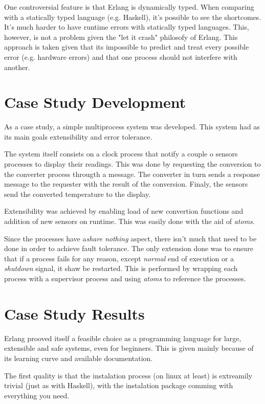 \documentclass[twocolumn,10pt]{article}
\begin{document}
One controversial feature is that Erlang is dynamically typed. When comparing with a statically typed language (e.g. Haskell), it's possible to see the shortcomes. It's much harder to have runtime errors with statically typed languages. This, however, is not a problem given the "let it crash" philosofy of Erlang. This approach is taken given that its impossible to predict and treat every possible error (e.g. hardware errors) and that one process should not interfere with another.

\section{Case Study Development}
As a case study, a simple multiprocess system was developed. This system had as its main goals extensibility and error tolerance.

The system itself consists on a clock process that notify a couple o sensors processes to display their readings. This was done by requesting the conversion to the converter process througth a message. The converter in turn sends a response message to the requester with the result of the conversion. Finaly, the sensors send the converted temperature to the display.

Extensibility was achieved by enabling load of new convertion functions and addition of new sensors on runtime. This was easily done with the aid of \textit{atoms}.

Since the processes have a\textit{share nothing} aspect, there isn't much that need to be done in order to achieve fault tolerance. The only extension done was to ensure that if a process fails for any reason, except \textit{normal} end of execution or a \textit{shutdown} signal, it shaw be restarted. This is performed by wrapping each process with a supervisor process and using \textit{atoms} to reference the processes.

\section{Case Study Results}
Erlang prooved itself a feasible choice as a programming language for large, extensible and safe systems, even for beginners. This is given mainly because of its learning curve and available documentation. 

The first quality is that the instalation process (on linux at least) is extreamily trivial (just as with Haskell), with the instalation package comming with everything you need.
\end{document}
